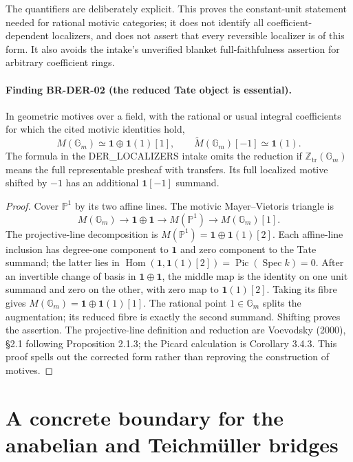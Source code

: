 The quantifiers are deliberately explicit.  This proves the
constant-unit statement needed for rational motivic categories;
it does not identify all coefficient-dependent localizers, and
does not assert that every reversible localizer is of this form.
It also avoids the intake's unverified blanket full-faithfulness
assertion for arbitrary coefficient rings.

\paragraph{Finding BR-DER-02 (the reduced Tate object is essential).}
In geometric motives over a field, with the rational or usual
integral coefficients for which the cited motivic identities hold,
\[
 M(\mathbb G_m)\simeq\mathbf1\oplus\mathbf1(1)[1],\qquad
 \widetilde M(\mathbb G_m)[-1]\simeq\mathbf1(1).
\]
The formula in the DER\_LOCALIZERS intake omits the reduction if
$\mathbb Z_{\mathrm{tr}}(\mathbb G_m)$ means the full representable
presheaf with transfers.  Its full localized motive shifted by
$-1$ has an additional $\mathbf1[-1]$ summand.

\begin{proof}
Cover $\mathbb P^1$ by its two affine lines.  The motivic
Mayer--Vietoris triangle is
\[
 M(\mathbb G_m)\longrightarrow\mathbf1\oplus\mathbf1
 \longrightarrow M(\mathbb P^1)\longrightarrow M(\mathbb G_m)[1].
\]
The projective-line decomposition is
$M(\mathbb P^1)=\mathbf1\oplus\mathbf1(1)[2]$.
Each affine-line inclusion has degree-one component to
$\mathbf1$ and zero component to the Tate summand; the latter
lies in $\operatorname{Hom}(\mathbf1,\mathbf1(1)[2])
=\operatorname{Pic}(\operatorname{Spec}k)=0$.
After an invertible change of basis in $\mathbf1\oplus\mathbf1$,
the middle map is the identity on one unit summand and zero on
the other, with zero map to $\mathbf1(1)[2]$.  Taking its fibre
gives $M(\mathbb G_m)=\mathbf1\oplus\mathbf1(1)[1]$.
The rational point $1\in\mathbb G_m$ splits the augmentation;
its reduced fibre is exactly the second summand.  Shifting proves
the assertion.  The projective-line definition and reduction are
Voevodsky (2000), \S2.1 following Proposition 2.1.3; the Picard
calculation is Corollary 3.4.3.  This proof spells out the corrected
form rather than reproving the construction of motives.
\end{proof}

\section{A concrete boundary for the anabelian and Teichm\"uller bridges}
\label{sec:root-anabelian}

